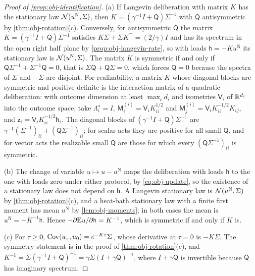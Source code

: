 \begin{proof}[Proof of \cref{prop:obj-identification}]
(a) If Langevin deliberation with matrix $K$ has the stationary law $\mathcal{N}(u^{\mathrm N},\Sigma)$, then $K=(\gamma^{-1}I+\mathsf Q)\Sigma^{-1}$ with $\mathsf Q$ antisymmetric by \cref{thm:obj-rotation}(c). Conversely, for antisymmetric $\mathsf Q$ the matrix $K=(\gamma^{-1}I+\mathsf Q)\Sigma^{-1}$ satisfies $K\Sigma+\Sigma K^\top=(2/\gamma)I$ and has its spectrum in the open right half plane by \cref{prop:obj-langevin-rate}, so with loads $\mathsf h=-Ku^{\mathrm N}$ its stationary law is $\mathcal{N}(u^{\mathrm N},\Sigma)$. The matrix $K$ is symmetric if and only if $\mathsf Q\Sigma^{-1}+\Sigma^{-1}\mathsf Q=0$, that is $\Sigma\mathsf Q+\mathsf Q\Sigma=0$, which forces $\mathsf Q=0$ because the spectra of $\Sigma$ and $-\Sigma$ are disjoint. For realizability, a matrix $K$ whose diagonal blocks are symmetric and positive definite is the interaction matrix of a quadratic deliberation: with outcome dimension at least $\max_id_i$ and isometries $\mathsf V_i$ of $\mathbb{R}^{d_i}$ into the outcome space, take $\Lambda^\star_i=I$, $\mathsf M^{(i)}_i=\mathsf V_iK_{ii}^{1/2}$ and $\mathsf M^{(i)}_j=\mathsf V_iK_{ii}^{-1/2}K_{ij}$, and $\mathsf z_i=\mathsf V_iK_{ii}^{-1/2}\mathsf h_i$. The diagonal blocks of $(\gamma^{-1}I+\mathsf Q)\Sigma^{-1}$ are $\gamma^{-1}(\Sigma^{-1})_{ii}+(\mathsf Q\Sigma^{-1})_{ii}$; for scalar acts they are positive for all small $\mathsf Q$, and for vector acts the realizable small $\mathsf Q$ are those for which every $(\mathsf Q\Sigma^{-1})_{ii}$ is symmetric.

(b) The change of variable $u\mapsto u-u^{\mathrm N}$ maps the deliberation with loads $\mathsf h$ to the one with loads zero under either protocol, by \eqref{eq:obj-update}, so the existence of a stationary law does not depend on $\mathsf h$. A Langevin stationary law is $\mathcal{N}(u^{\mathrm N},\Sigma)$ by \cref{thm:obj-rotation}(c), and a heat-bath stationary law with a finite first moment has mean $u^{\mathrm N}$ by \cref{lem:obj-moments}; in both cases the mean is $u^{\mathrm N}=-K^{-1}\mathsf h$. Hence $-\partial\mathbb{E} u/\partial\mathsf h=K^{-1}$, which is symmetric if and only if $K$ is.

(c) For $\tau\ge0$, $\operatorname{Cov}(u_\tau,u_0)=e^{-K\tau}\Sigma$, whose derivative at $\tau=0$ is $-K\Sigma$. The symmetry statement is in the proof of \cref{thm:obj-rotation}(c), and $K^{-1}=\Sigma(\gamma^{-1}I+\mathsf Q)^{-1}=\gamma\Sigma(I+\gamma\mathsf Q)^{-1}$, where $I+\gamma\mathsf Q$ is invertible because $\mathsf Q$ has imaginary spectrum.
\end{proof}

